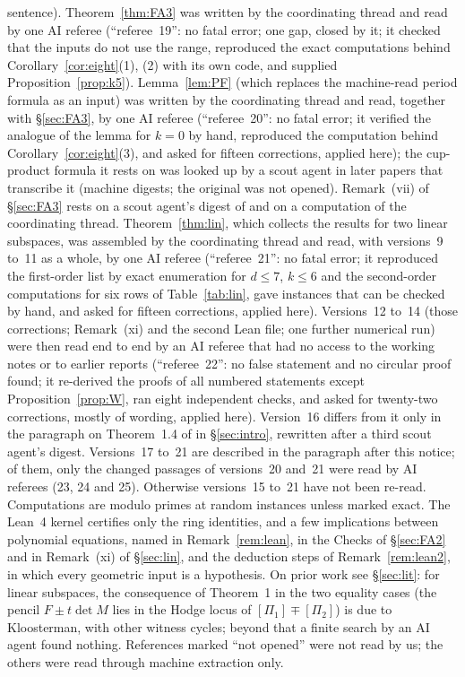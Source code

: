 \documentclass[11pt]{article}
\numberwithin{equation}{section}
\theoremstyle{remark}
\begin{document}
\begin{center}
{{sentence). Theorem~\ref{thm:FA3} was written by the coordinating thread and read by one AI referee
(``referee~19'': no fatal error; one gap, closed by it; it checked that the inputs do not use the range,
reproduced the exact computations behind Corollary~\ref{cor:eight}(1), (2) with its own code, and supplied
Proposition~\ref{prop:k5}). Lemma~\ref{lem:PF} (which replaces the machine-read period formula as an input) was
written by the coordinating thread and read, together with \S\ref{sec:FA3}, by one AI referee (``referee~20'': no
fatal error; it verified the analogue of the lemma for $k=0$ by hand, reproduced the computation behind
Corollary~\ref{cor:eight}(3), and asked for fifteen corrections, applied here); the cup-product formula it
rests on was looked up by a scout agent in later papers that transcribe it (machine digests; the original was
not opened). Remark~(vii) of \S\ref{sec:FA3} rests on a scout agent's digest of \cite{Kl2} and on a computation
of the coordinating thread. Theorem~\ref{thm:lin}, which collects the results for two linear subspaces, was
assembled by the coordinating thread and read, with versions~9 to~11 as a whole, by one AI referee
(``referee~21'': no fatal error; it reproduced the first-order list by exact enumeration for $d\le7$, $k\le6$ and
the second-order computations for six rows of Table~\ref{tab:lin}, gave instances that can be checked by hand,
and asked for fifteen corrections, applied here). Versions~12 to~14 (those corrections; Remark~(xi) and the
second Lean file; one further numerical run) were then read end to end by an AI referee that had no access to
the working notes or to earlier reports (``referee~22'': no false statement and no circular proof found; it
re-derived the proofs of all numbered statements except Proposition~\ref{prop:W}, ran eight independent
checks, and asked for twenty-two corrections, mostly of wording, applied here). Version~16 differs from it only in
the paragraph on Theorem~1.4 of \cite{Kl} in \S\ref{sec:intro}, rewritten after a third scout agent's digest.
Versions~17 to~21 are described in the paragraph after this notice; of them, only the changed passages of
versions~20 and~21 were read by AI referees (23, 24 and 25). Otherwise versions~15 to~21 have not been re-read. Computations are modulo primes at random instances
unless marked exact. The Lean~4 kernel certifies only the ring identities, and a few implications between polynomial equations,
named in Remark~\ref{rem:lean}, in the Checks of \S\ref{sec:FA2} and in Remark~(xi) of \S\ref{sec:lin}, and the
deduction steps of Remark~\ref{rem:lean2}, in which every geometric input is a hypothesis. On
prior work see \S\ref{sec:lit}: for linear subspaces, the consequence of Theorem~1 in the two equality cases
(the pencil $F\pm t\det M$ lies in the Hodge locus of $[\Pi_1]\mp[\Pi_2]$) is due to Kloosterman, with other
witness cycles; beyond that a finite search by an AI agent found nothing. References marked ``not opened'' were
not read by us; the others were read through machine extraction only.}}
\end{center}
\end{document}

